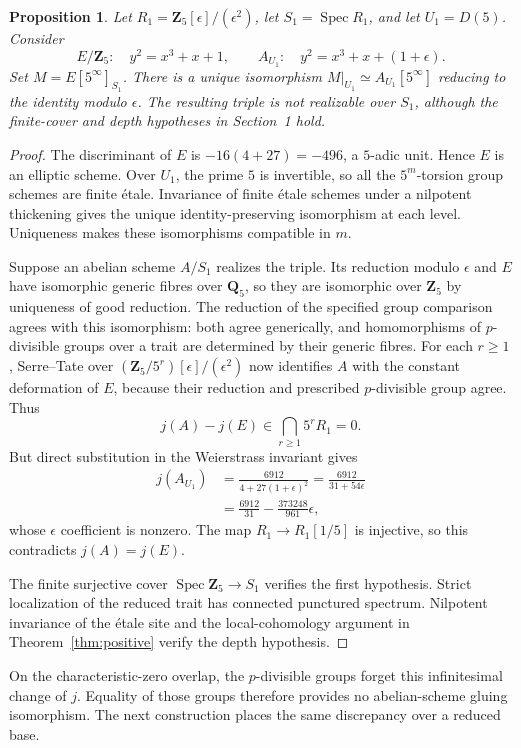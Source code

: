 \documentclass[11pt]{article}
\newtheorem{proposition}[theorem]{Proposition}
\theoremstyle{remark}\newtheorem{remark}[theorem]{Remark}
\newcommand{\Spec}{\operatorname{Spec}}
\begin{document}
\begin{proposition}\label{prop:mixed}
Let $R_1=\mathbf Z_5[\epsilon]/(\epsilon^2)$, let $S_1=\Spec R_1$, and let $U_1=D(5)$. Consider
\[
 E/\mathbf Z_5:\quad y^2=x^3+x+1,
 \qquad A_{U_1}:\quad y^2=x^3+x+(1+\epsilon).
\]
Set $M=E[5^\infty]_{S_1}$. There is a unique isomorphism
$M|_{U_1}\simeq A_{U_1}[5^\infty]$ reducing to the identity modulo $\epsilon$. The resulting triple is not realizable over $S_1$, although the finite-cover and depth hypotheses in Section~1 hold.
\end{proposition}
\begin{proof}
The discriminant of $E$ is $-16(4+27)=-496$, a $5$-adic unit. Hence $E$ is an elliptic scheme. Over $U_1$, the prime $5$ is invertible, so all the $5^m$-torsion group schemes are finite \'etale. Invariance of finite \'etale schemes under a nilpotent thickening gives the unique identity-preserving isomorphism at each level. Uniqueness makes these isomorphisms compatible in $m$.

Suppose an abelian scheme $A/S_1$ realizes the triple. Its reduction modulo $\epsilon$ and $E$ have isomorphic generic fibres over $\mathbf Q_5$, so they are isomorphic over $\mathbf Z_5$ by uniqueness of good reduction. The reduction of the specified group comparison agrees with this isomorphism: both agree generically, and homomorphisms of $p$-divisible groups over a trait are determined by their generic fibres. For each $r\geq1$, Serre--Tate over $(\mathbf Z_5/5^r)[\epsilon]/(\epsilon^2)$ now identifies $A$ with the constant deformation of $E$, because their reduction and prescribed $p$-divisible group agree. Thus
\[
 j(A)-j(E)\in\bigcap_{r\geq1}5^rR_1=0.
\]
But direct substitution in the Weierstrass invariant gives
\begin{align*}
 j(A_{U_1})
 &=\frac{6912}{4+27(1+\epsilon)^2}
   =\frac{6912}{31+54\epsilon}\\
 &=\frac{6912}{31}-\frac{373248}{961}\epsilon,
\end{align*}
whose $\epsilon$ coefficient is nonzero. The map $R_1\to R_1[1/5]$ is injective, so this contradicts $j(A)=j(E)$.

The finite surjective cover $\Spec\mathbf Z_5\to S_1$ verifies the first hypothesis. Strict localization of the reduced trait has connected punctured spectrum. Nilpotent invariance of the \'etale site and the local-cohomology argument in Theorem~\ref{thm:positive} verify the depth hypothesis.
\end{proof}

On the characteristic-zero overlap, the $p$-divisible groups forget this infinitesimal change of $j$. Equality of those groups therefore provides no abelian-scheme gluing isomorphism. The next construction places the same discrepancy over a reduced base.
\end{document}
